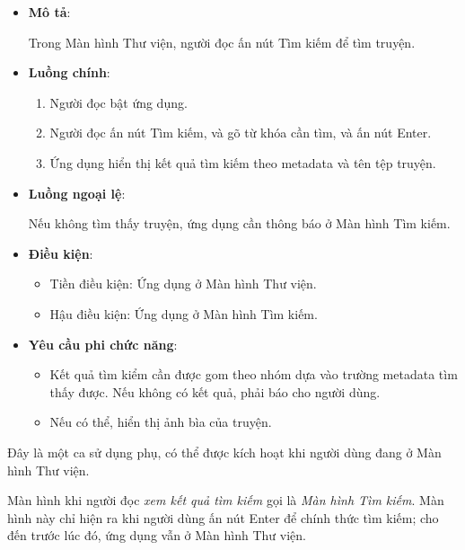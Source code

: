 \documentclass[../../thesis]{subfiles}
\begin{document}
\begin{itemize}
    \item
        \textbf{Mô tả}:

        Trong Màn hình Thư viện, người đọc ấn nút Tìm kiếm để tìm truyện.
    \item
        \textbf{Luồng chính}:

        \begin{enumerate}
            \item
                Người đọc bật ứng dụng.
            \item
                Người đọc ấn nút Tìm kiếm, và gõ từ khóa cần tìm, và ấn nút
                Enter.
            \item
                Ứng dụng hiển thị kết quả tìm kiếm theo metadata và tên tệp
                truyện.
        \end{enumerate}
    \item
        \textbf{Luồng ngoại lệ}:

        Nếu không tìm thấy truyện, ứng dụng cần thông báo ở Màn hình Tìm kiếm.
    \item
        \textbf{Điều kiện}:

        \begin{itemize}
            \item
                Tiền điều kiện: Ứng dụng ở Màn hình Thư viện.
            \item
                Hậu điều kiện: Ứng dụng ở Màn hình Tìm kiếm.
        \end{itemize}
    \item
        \textbf{Yêu cầu phi chức năng}:

        \begin{itemize}
            \item
                Kết quả tìm kiểm cần được gom theo nhóm dựa vào trường metadata
                tìm thấy được. Nếu không có kết quả, phải báo cho người dùng.
            \item
                Nếu có thể, hiển thị ảnh bìa của truyện.
        \end{itemize}
  \end{itemize}

Đây là một ca sử dụng phụ, có thể được kích hoạt khi người dùng đang ở Màn hình
Thư viện.

Màn hình khi người đọc \emph{xem kết quả tìm kiếm} gọi là \emph{Màn hình Tìm
kiếm}. Màn hình này chỉ hiện ra khi người dùng ấn nút Enter để chính thức tìm
kiếm; cho đến trước lúc đó, ứng dụng vẫn ở Màn hình Thư viện.
\end{document}
